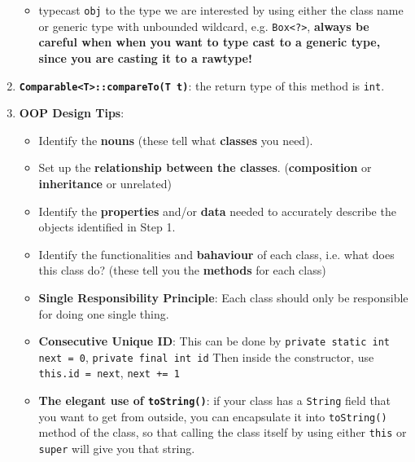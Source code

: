 \documentclass[10pt, landscape]{article}
\begin{document}
\begin{multicols}{4}
\begin{enumerate}
\begin{itemize}
        \item typecast \texttt{obj} to the type we are interested by using either the class name or generic type with unbounded wildcard, e.g. \texttt{Box<?>}, \textbf{always be careful when when you want to type cast to a generic type, since you are casting it to a rawtype!}
    \end{itemize}
    \item \textbf{\texttt{Comparable<T>::compareTo(T t)}}: the return type of this method is \texttt{int}.
    \item \textbf{OOP Design Tips}:
    \begin{itemize}
        \item Identify the \textbf{nouns} (these tell what \textbf{classes} you need).
        \item Set up the \textbf{relationship between the classes}. (\textbf{composition} or \textbf{inheritance} or unrelated)
        \item Identify the \textbf{properties} and/or \textbf{data} needed to accurately describe the objects identified in Step 1.
        \item Identify the functionalities and \textbf{bahaviour} of each class, i.e. what does this class do? (these tell you the \textbf{methods} for each class)
        \item \textbf{Single Responsibility Principle}: Each class should only be responsible for doing one single thing.
        \item \textbf{Consecutive Unique ID}: This can be done by \texttt{private static int next = 0}, \texttt{private final int id} Then inside the constructor, use \texttt{this.id = next}, \texttt{next += 1}
        \item \textbf{The elegant use of \texttt{toString()}}: if your class has a \texttt{String} field that you want to get from outside, you can encapsulate it into \texttt{toString()} method of the class, so that calling the class itself by using either \texttt{this} or \texttt{super} will give you that string.
    \end{itemize}
\end{enumerate}


\end{multicols}
\end{document}

